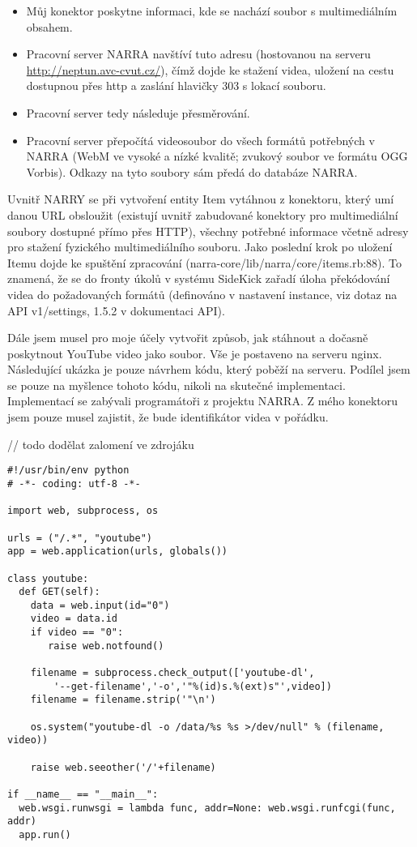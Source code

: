 \begin{itemize}
\item Můj konektor poskytne informaci, kde se nachází soubor s multimediálním obsahem.
\item Pracovní server NARRA navštíví tuto adresu (hostovanou na serveru \url{http://neptun.avc-cvut.cz/}), čímž dojde ke stažení videa, uložení na cestu dostupnou přes http a zaslání hlavičky 303 s lokací souboru.
\item Pracovní server tedy následuje přesměrování. %
\item Pracovní server přepočítá videosoubor do všech formátů potřebných v NARRA (WebM ve vysoké a nízké kvalitě; zvukový soubor ve formátu OGG Vorbis). Odkazy na tyto soubory sám předá do databáze NARRA.
\end{itemize}

\par Uvnitř NARRY se při vytvoření entity Item vytáhnou z konektoru, který umí danou URL obsloužit (existují uvnitř zabudované konektory pro multimediální soubory dostupné přímo přes HTTP), všechny potřebné informace včetně adresy pro stažení fyzického multimediálního souboru. Jako poslední krok po uložení Itemu dojde ke spuštění zpracování (narra-core/lib/narra/core/\newline items.rb:88). To znamená, že se do fronty úkolů v systému SideKick zařadí úloha překódování videa do požadovaných formátů (definováno v nastavení instance, viz dotaz na API v1/settings, 1.5.2 v dokumentaci API).
\par Dále jsem musel pro moje účely vytvořit způsob, jak stáhnout a dočasně poskytnout YouTube video jako soubor. Vše je postaveno na serveru nginx. Následující ukázka je pouze návrhem kódu, který poběží na serveru. Podílel jsem se pouze na myšlence tohoto kódu, nikoli na skutečné implementaci. Implementací se zabývali programátoři z projektu NARRA. Z mého konektoru jsem pouze musel zajistit, že bude identifikátor videa v pořádku.

// todo dodělat zalomení ve zdrojáku

\begin{verbatim}
#!/usr/bin/env python
# -*- coding: utf-8 -*-

import web, subprocess, os

urls = ("/.*", "youtube")
app = web.application(urls, globals())

class youtube:
  def GET(self):
    data = web.input(id="0")
    video = data.id
    if video == "0":
       raise web.notfound()
 
    filename = subprocess.check_output(['youtube-dl',
        '--get-filename','-o','"%(id)s.%(ext)s"',video])
    filename = filename.strip('"\n')
    
    os.system("youtube-dl -o /data/%s %s >/dev/null" % (filename, video))
 
    raise web.seeother('/'+filename)
 
if __name__ == "__main__":
  web.wsgi.runwsgi = lambda func, addr=None: web.wsgi.runfcgi(func, addr)
  app.run()
\end{verbatim}